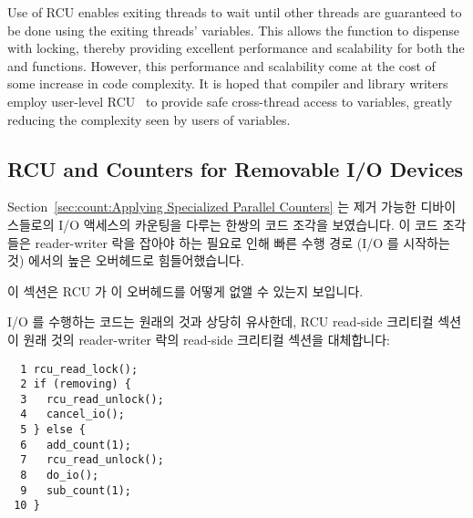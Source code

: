Use of RCU enables exiting threads to wait until other threads are
guaranteed to be done using the exiting threads'  variables.
This allows the  function to dispense with locking,
thereby providing
excellent performance and scalability for both the 
and  functions.
However, this performance and scalability come at the cost of some increase
in code complexity.
It is hoped that compiler and library writers employ user-level
RCU~\cite{MathieuDesnoyers2009URCU} to provide safe cross-thread
access to  variables, greatly reducing the
complexity seen by users of  variables.
\fi

\subsection{RCU and Counters for Removable I/O Devices}
\label{sec:together:RCU and Counters for Removable I/O Devices}

Section~\ref{sec:count:Applying Specialized Parallel Counters}
는 제거 가능한 디바이스들로의 I/O 액세스의 카운팅을 다루는 한쌍의 코드 조각을
보였습니다.
이 코드 조각들은 reader-writer 락을 잡아야 하는 필요로 인해 빠른 수행 경로 (I/O
를 시작하는 것) 에서의 높은 오버헤드로 힘들어했습니다.

이 섹션은 RCU 가 이 오버헤드를 어떻게 없앨 수 있는지 보입니다.

I/O 를 수행하는 코드는 원래의 것과 상당히 유사한데, RCU read-side 크리티컬
섹션이 원래 것의 reader-writer 락의 read-side 크리티컬 섹션을 대체합니다:
\iffalse

Section~\ref{sec:count:Applying Specialized Parallel Counters}
showed a fanciful pair of code fragments for dealing with counting
I/O accesses to removable devices.
These code fragments suffered from high overhead on the fastpath
(starting an I/O) due to the need to acquire a reader-writer
lock.

This section shows how RCU may be used to avoid this overhead.

The code for performing an I/O is quite similar to the original, with
an RCU read-side critical section being substituted for the reader-writer
lock read-side critical section in the original:
\fi

\vspace{5pt}
\begin{minipage}[t]{\columnwidth}
\small
\begin{verbatim}
  1 rcu_read_lock();
  2 if (removing) {
  3   rcu_read_unlock();
  4   cancel_io();
  5 } else {
  6   add_count(1);
  7   rcu_read_unlock();
  8   do_io();
  9   sub_count(1);
 10 }
\end{verbatim}
\end{minipage}
\vspace{5pt}

